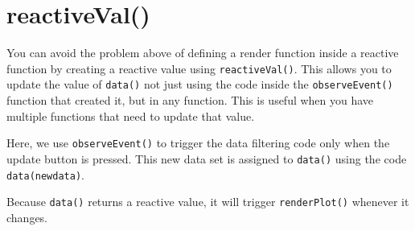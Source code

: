 \documentclass[
  oneside]{book}
\begin{document}
\hypertarget{reactiveval}{%
\section{reactiveVal()}\label{reactiveval}}

You can avoid the problem above of defining a render function inside a reactive function by creating a reactive value using \texttt{reactiveVal}\texttt{()}. This allows you to update the value of \texttt{data}\texttt{()} not just using the code inside the \texttt{observeEvent}\texttt{()} function that created it, but in any function. This is useful when you have multiple functions that need to update that value.

Here, we use \texttt{observeEvent}\texttt{()} to trigger the data filtering code only when the update button is pressed. This new data set is assigned to \texttt{data}\texttt{()} using the code \texttt{data(newdata)}.

Because \texttt{data}\texttt{()} returns a reactive value, it will trigger \texttt{renderPlot}\texttt{()} whenever it changes.
\end{document}
